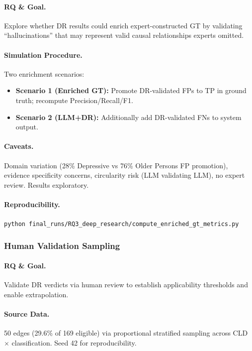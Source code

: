 \paragraph{RQ \& Goal.}
Explore whether DR results could enrich expert-constructed GT by validating ``hallucinations'' that may represent valid causal relationships experts omitted.

\paragraph{Simulation Procedure.}
Two enrichment scenarios:
\begin{itemize}[noitemsep]
    \item \textbf{Scenario 1 (Enriched GT):} Promote DR-validated FPs to TP in ground truth; recompute Precision/Recall/F1.
    \item \textbf{Scenario 2 (LLM+DR):} Additionally add DR-validated FNs to system output.
\end{itemize}

\paragraph{Caveats.}
Domain variation (28\% Depressive vs 76\% Older Persons FP promotion), evidence specificity concerns, circularity risk (LLM validating LLM), no expert review. Results exploratory.

\paragraph{Reproducibility.}
\texttt{python final\_runs/RQ3\_deep\_research/compute\_enriched\_gt\_metrics.py}

\subsubsection{Human Validation Sampling}
\label{sec:rq3_human_validation}

\paragraph{RQ \& Goal.}
Validate DR verdicts via human review to establish applicability thresholds and enable extrapolation.

\paragraph{Source Data.}
50 edges (29.6\% of 169 eligible) via proportional stratified sampling across CLD $\times$ classification. Seed 42 for reproducibility.

